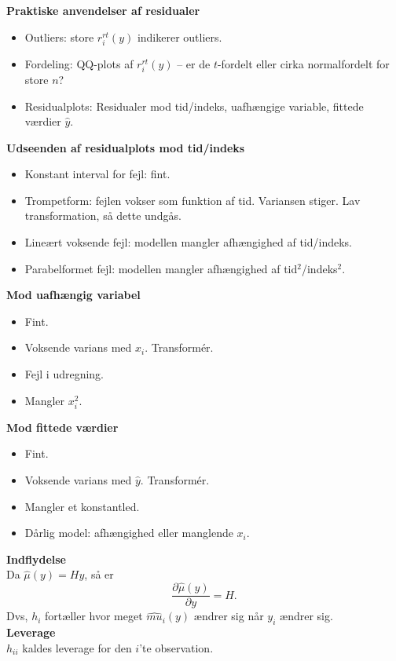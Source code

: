 \documentclass[12pt,a4paper]{report}
\begin{document}
\textbf{Praktiske anvendelser af residualer}
\begin{itemize}
\item Outliers: store $r_i^{rt}(y)$ indikerer outliers.
\item Fordeling: QQ-plots af $r_i^{rt}(y)$ -- er de $t$-fordelt eller cirka normalfordelt for store $n$?
\item Residualplots: Residualer mod tid/indeks, uafhængige variable, fittede værdier $\hat{y}$.
\end{itemize}
\textbf{Udseenden af residualplots mod tid/indeks}
\begin{itemize}
\item Konstant interval for fejl: fint.
\item Trompetform: fejlen vokser som funktion af tid. Variansen stiger. Lav transformation, så dette undgås.
\item Lineært voksende fejl: modellen mangler afhængighed af tid/indeks.
\item Parabelformet fejl: modellen mangler afhængighed af tid$^2$/indeks$^2$.
\end{itemize}
\textbf{Mod uafhængig variabel}
\begin{itemize}
\item Fint.
\item Voksende varians med $x_i$. Transformér.
\item Fejl i udregning.
\item Mangler $x_i^2$.
\end{itemize}
\textbf{Mod fittede værdier}
\begin{itemize}
\item Fint.
\item Voksende varians med $\hat{y}$. Transformér.
\item Mangler et konstantled.
\item Dårlig model: afhængighed eller manglende $x_i$.
\end{itemize}
\textbf{Indflydelse}\\
Da $\hat{\mu}(y)=Hy$, så er
\begin{equation*}
\frac{\partial \hat{\mu}(y)}{\partial y}=H.
\end{equation*}
Dvs, $h_i$ fortæller hvor meget $\hat{mu}_i(y)$ ændrer sig når $y_i$ ændrer sig.\\
\textbf{Leverage}\\
$h_{ii}$ kaldes leverage for den $i$'te observation.
\end{document}
